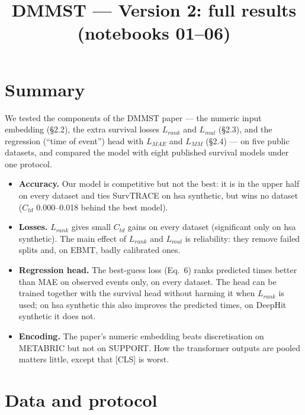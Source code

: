 \documentclass[11pt]{article}
\title{DMMST --- Version 2: full results\\(notebooks 01--06)}
\author{}
\date{}
\begin{document}
\maketitle
\tableofcontents
\newpage

\section{Summary}
We tested the components of the DMMST paper --- the numeric input embedding (\S2.2), the extra
survival losses $L_{rank}$ and $L_{mul}$ (\S2.3), and the regression (``time of event'') head with
$L_{MAE}$ and $L_{MM}$ (\S2.4) --- on five public datasets, and compared the model with eight
published survival models under one protocol.

\begin{itemize}
  \item \textbf{Accuracy.} Our model is competitive but not the best: it is in the upper half on every
        dataset and ties SurvTRACE on hsa synthetic, but wins no dataset ($C_{td}$ 0.000--0.018 behind
        the best model).
  \item \textbf{Losses.} $L_{rank}$ gives small $C_{td}$ gains on every dataset (significant only on
        hsa synthetic). The main effect of $L_{rank}$ and $L_{mul}$ is reliability: they remove failed
        splits and, on EBMT, badly calibrated ones.
  \item \textbf{Regression head.} The best-guess loss (Eq.~6) ranks predicted times better than MAE on
        observed events only, on every dataset. The head can be trained together with the survival head
        without harming it when $L_{rank}$ is used; on hsa synthetic this also improves the predicted
        times, on DeepHit synthetic it does not.
  \item \textbf{Encoding.} The paper's numeric embedding beats discretisation on METABRIC but not on
        SUPPORT. How the transformer outputs are pooled matters little, except that [CLS] is worst.
\end{itemize}

\section{Data and protocol}
\end{document}
